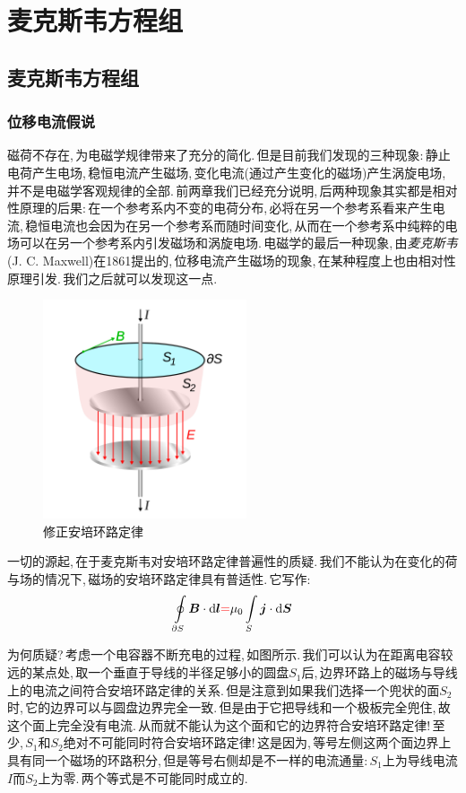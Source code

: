 \chapter{麦克斯韦方程组}


\section{麦克斯韦方程组}

\subsection{位移电流假说}

磁荷不存在,\,为电磁学规律带来了充分的简化.\,但是目前我们发现的三种现象:\,静止电荷产生电场,\,稳恒电流产生磁场,\,变化电流(通过产生变化的磁场)产生涡旋电场,\,并不是电磁学客观规律的全部.\,前两章我们已经充分说明,\,后两种现象其实都是相对性原理的后果:\,在一个参考系内不变的电荷分布,\,必将在另一个参考系看来产生电流,\,稳恒电流也会因为在另一个参考系而随时间变化,\,从而在一个参考系中纯粹的电场可以在另一个参考系内引发磁场和涡旋电场.\,电磁学的最后一种现象,\,由\emph{麦克斯韦}(J. C. Maxwell)在1861提出的,\,位移电流产生磁场的现象,\,在某种程度上也由相对性原理引发.\,我们之后就可以发现这一点.

\begin{figure}
\vspace{-0.1cm}
\centering
\includegraphics[width=6cm]{image/7-6-1.png}
\caption{修正安培环路定律}
\end{figure}
一切的源起,\,在于麦克斯韦对安培环路定律普遍性的质疑.\,我们不能认为在变化的荷与场的情况下,\,磁场的安培环路定律具有普适性.\,它写作:
\[\oint\limits_{\partial S} \boldsymbol{B}\cdot \textrm{d} \boldsymbol{l}{\color{red}{=}}\mu_0\int\limits_{S}\boldsymbol{j}\cdot \textrm{d} \boldsymbol{S}\]

为何质疑?\,考虑一个电容器不断充电的过程,\,如图所示.\,我们可以认为在距离电容较远的某点处,\,取一个垂直于导线的半径足够小的圆盘$S_1$后,\,边界环路上的磁场与导线上的电流之间符合安培环路定律的关系.\,但是注意到如果我们选择一个兜状的面$S_2$时,\,它的边界可以与圆盘边界完全一致.\,但是由于它把导线和一个极板完全兜住,\,故这个面上完全没有电流.\,从而就不能认为这个面和它的边界符合安培环路定律!\,至少,\,$S_1$和$S_2$绝对不可能同时符合安培环路定律!\,这是因为,\,等号左侧这两个面边界上具有同一个磁场的环路积分,\,但是等号右侧却是不一样的电流通量:\,$S_1$上为导线电流$I$而$S_2$上为零.\,两个等式是不可能同时成立的.

